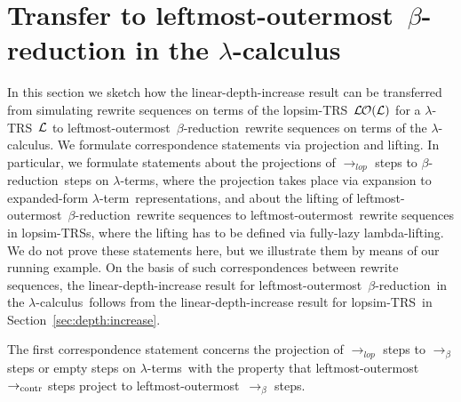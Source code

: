 \documentclass[
submission
]{dmtcs-episciences-tampered}
\newcommand{\indap}[2]{#1 _{#2}}
\newcommand{\supap}[2]{#1 ^{#2}}
\newcommand{\pap}{\supap}
\newcommand{\nb}{\nobreakdash}
\newcommand{\nf}{\normalfont}
\newcommand{\alTRS}{{\cal L}}
\newcommand{\TRS}{TRS}
\newcommand{\slop}{\textit{lop}}\newcommand{\slopstar}{\pap{\slop}{*}}
\newcommand{\lopsimTRS}{lopsim-TRS}
\newcommand{\sred}{\to}
\newcommand{\sredi}{\indap{\sred}}
\newcommand{\scriptcontract}{\text{\nf contr}}
\newcommand{\scontractred}{\sredi{\scriptcontract}}
\newcommand{\slopsimred}{\sredi{\slop}}
\newcommand{\sbetared}{\sred_{\beta}}
\newcommand{\lambdacalculus}{$\lambda$\nb-cal\-cu\-lus}
\newcommand{\lambdaterm}{$\lambda$\nb-term}
\newcommand{\lambdaterms}{\lambdaterm{s}}
\newcommand{\lambdalifting}{lambda-lif\-ting}
\newcommand{\betareduction}{$\beta$\nb-re\-duc\-tion}
\newcommand{\lo}{left\-most-outer\-most}
\newcommand{\lTRS}{$\lambda$\hspace*{-0.5pt}\nb-\hspace*{-0.5pt}\TRS}
\theoremstyle{plain}
\theoremstyle{definition}
\begin{document}
 
  





\section{Transfer to \lo\ 
         $\beta$\nb-reduction in the \lambdacalculus}
  \label{sec:transfer:lambda-calculus}


In this section we sketch how the linear-depth-increase result can be transferred from simulating rewrite sequences on terms of the \lopsimTRS~$\lopsimTRSwrt{\alTRS}$
for a \lTRS~$\alTRS$ to \lo\ \betareduction\ rewrite sequences on terms of the \lambdacalculus. 
We formulate correspondence statements via projection and lifting. In particular, we formulate statements about the projections of $\slopsimred$ steps to \betareduction\ steps on \lambdaterms,
where the projection takes place via expansion to expanded-form \lambdaterm\ representations,
and about the lifting of \lo\ \betareduction\ rewrite sequences to \lo\ rewrite sequences in \lopsimTRS{s},
where the lifting has to be defined via fully-lazy \lambdalifting. 
We do not prove these statements here, but we illustrate them by means of our running example. 
On the basis of such correspondences between rewrite sequences, the linear-depth-increase result for \lo\ \betareduction\ in the \lambdacalculus\
follows from the linear-depth-increase result for \lopsimTRS\ in Section~\ref{sec:depth:increase}. 



The first correspondence statement concerns the projection of $\slopsimred$ steps to $\sbetared$ steps or empty steps on \lambdaterms\
with the property that \lo\ $\scontractred$ steps project to \lo\ $\sbetared$ steps. 
\end{document}
